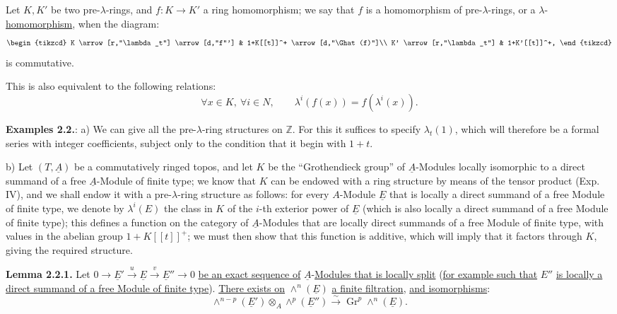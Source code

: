 Let \(K,K'\) be two pre-\(\lambda\)-rings, and \(f:K\to K'\) a ring homomorphism; we say that \(f\) is a homomorphism of pre-\(\lambda\)-rings, or a \(\lambda\)-\uline{homomorphism}, when the diagram:
\[
\begin{tikzcd}
K \arrow[r,"\lambda_t"] \arrow[d,"f"'] &
1+K[[t]]^+ \arrow[d,"\Ghat(f)"]\\
K' \arrow[r,"\lambda_t"] &
1+K'[[t]]^+,
\end{tikzcd}
\]
is commutative.

This is also equivalent to the following relations:
\[
  \forall x\in K,\ \forall i\in N,\qquad
  \lambda^i(f(x))=f(\lambda^i(x)).
\]

%
\textbf{Examples 2.2.}: a) We can give all the pre-\(\lambda\)-ring structures on \(\mathbb Z\). For this it suffices to specify \(\lambda_t(1)\), which will therefore be a formal series with integer coefficients, subject only to the condition that it begin with \(1+t\).

b) Let \((T,\underline{A})\) be a commutatively ringed topos, and let \(K\) be the ``Grothendieck group'' of \(\underline{A}\)-Modules locally isomorphic to a direct summand of a free \(\underline{A}\)-Module of finite type; we know that \(K\) can be endowed with a ring structure by means of the tensor product (Exp. IV), and we shall endow it with a pre-\(\lambda\)-ring structure as follows: for every \(A\)-Module \(\underline{E}\) that is locally a direct summand of a free Module of finite type, we denote by \(\lambda^i(E)\) the class in \(K\) of the \(i\)-th exterior power of \(\underline{E}\) (which is also locally a direct summand of a free Module of finite type); this defines a function on the category of \(\underline{A}\)-Modules that are locally direct summands of a free Module of finite type, with values in the abelian group \(1+K[[t]]^+\); we must then show that this function is additive, which will imply that it factors through \(K\), giving the required structure.

\textbf{Lemma 2.2.1.} Let \(0\longrightarrow \underline{E}' \xrightarrow{u} \underline{E} \xrightarrow{v} \underline{E}''\longrightarrow0\) \uline{be an exact sequence of} \(\underline{A}\)-\uline{Modules that is locally split} (\uline{for example such that} \(E''\) \uline{is locally a direct summand of a free Module of finite type}). \uline{There exists on} \(\wedge^n(\underline{E})\) \uline{a finite filtration}, \uline{and isomorphisms}:
\[
  \wedge^{n-p}(\underline{E}')\otimes_A\wedge^p(\underline{E}'')
  \xrightarrow{\sim}
  \operatorname{Gr}^p\wedge^n(\underline{E}).
\]

